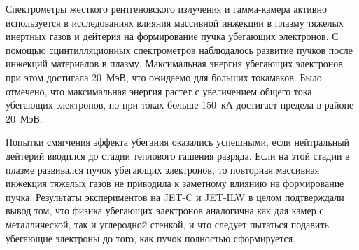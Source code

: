 Спектрометры жесткого рентгеновского излучения и гамма-камера активно используется в исследованиях влияния массивной инжекции в плазму тяжелых инертных газов и дейтерия на формирование пучка убегающих электронов. С помощью сцинтилляционных спектрометров наблюдалось развитие пучков после инжекций материалов в плазму. Максимальная энергия убегающих электронов при этом достигала 20~МэВ, что ожидаемо для больших токамаков. Было отмечено, что максимальная энергия растет с увеличением общего тока убегающих электронов, но при токах больше 150~кА достигает предела в районе 20~МэВ.

Попытки смягчения эффекта убегания оказались успешными, если нейтральный дейтерий вводился до стадии теплового гашения разряда. Если на этой стадии в плазме развивался пучок убегающих электронов, то повторная массивная инжекция тяжелых газов не приводила к заметному влиянию на формирование пучка.  Результаты экспериментов на JET-C и JET-ILW в целом подтверждали вывод том, что физика убегающих электронов аналогична как для камер с металлической, так и углеродной стенкой, и что следует пытаться подавить убегающие электроны до того, как пучок полностью сформируется.


\clearpage
